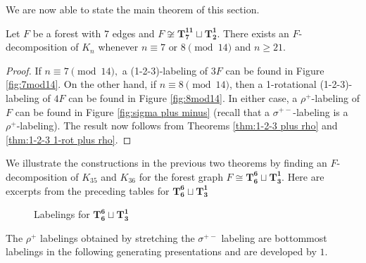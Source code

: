 \documentclass{dmgt}
\begin{document}
We are now able to state the main theorem of this section.
\begin{theorem}\label{thm:7 or 8 mod 14}
    Let $F$ be a forest with $7$ edges and $F \not \cong \mathbf{T_{7}^{11}}\sqcup\mathbf{T_{2}^{1}}$. There exists an $F$-decomposition of $K_n$ whenever $n \equiv 7 \textrm{ or } 8 \pmod{14}$ and $n \geq 21.$
\end{theorem}
\begin{proof}
    If $n \equiv 7 \pmod{14},$ a (1-2-3)-labeling of $3F$ can be found in Figure \ref{fig:7mod14}. On the other hand, if $n \equiv 8 \pmod{14}$, then a 1-rotational (1-2-3)-labeling of $4F$ can be found in Figure \ref{fig:8mod14}. In either case, a $\rho^{+}$-labeling of $F$ can be found in Figure \ref{fig:sigma plus minus} (recall that a $\sigma^{+-}$-labeling is a $\rho^{+}$-labeling). The result now follows from Theorems \ref{thm:1-2-3 plus rho} and \ref{thm:1-2-3 1-rot plus rho}. 
\end{proof}
\begin{exm}
We illustrate the constructions in the previous two theorems by finding an $F$-decomposition of $K_{35}$ and $K_{36}$ for the forest graph $F \cong \mathbf{T_{6}^{6}} \sqcup \mathbf{T_{3}^{1}}$. 
\newpage
\noindent Here are excerpts from the preceding tables for $\mathbf{T_{6}^{6}} \sqcup \mathbf{T_{3}^{1}}$

\begin{figure}[H]
\centering
        \scalebox{0.4}{}
        \caption{Labelings for $\mathbf{T_{6}^{6}} \sqcup \mathbf{T_{3}^{1}}$}
        \label{fig:example chart}
\end{figure}

The $\rho^{+}$ labelings obtained by stretching the $\sigma^{+-}$ labeling are bottommost labelings in the following generating presentations and are developed by $1$.
\end{exm}

        
        
\end{document}
